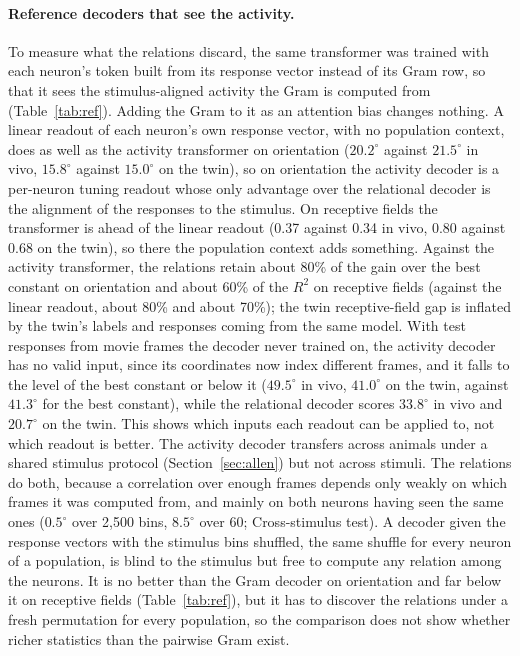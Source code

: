 \documentclass[11pt]{article}
\newcommand{\Rsq}{R^{2}}
\begin{document}
\paragraph{Reference decoders that see the activity.} To measure what the relations discard, the same transformer was trained with each neuron's token built from its response vector instead of its Gram row, so that it sees the stimulus-aligned activity the Gram is computed from (Table~\ref{tab:ref}). Adding the Gram to it as an attention bias changes nothing. A linear readout of each neuron's own response vector, with no population context, does as well as the activity transformer on orientation ($20.2^\circ$ against $21.5^\circ$ in vivo, $15.8^\circ$ against $15.0^\circ$ on the twin), so on orientation the activity decoder is a per-neuron tuning readout whose only advantage over the relational decoder is the alignment of the responses to the stimulus. On receptive fields the transformer is ahead of the linear readout (0.37 against 0.34 in vivo, 0.80 against 0.68 on the twin), so there the population context adds something. Against the activity transformer, the relations retain about 80\% of the gain over the best constant on orientation and about 60\% of the $\Rsq$ on receptive fields (against the linear readout, about 80\% and about 70\%); the twin receptive-field gap is inflated by the twin's labels and responses coming from the same model. With test responses from movie frames the decoder never trained on, the activity decoder has no valid input, since its coordinates now index different frames, and it falls to the level of the best constant or below it ($49.5^\circ$ in vivo, $41.0^\circ$ on the twin, against $41.3^\circ$ for the best constant), while the relational decoder scores $33.8^\circ$ in vivo and $20.7^\circ$ on the twin. This shows which inputs each readout can be applied to, not which readout is better. The activity decoder transfers across animals under a shared stimulus protocol (Section~\ref{sec:allen}) but not across stimuli. The relations do both, because a correlation over enough frames depends only weakly on which frames it was computed from, and mainly on both neurons having seen the same ones ($0.5^\circ$ over 2,500 bins, $8.5^\circ$ over 60; Cross-stimulus test). A decoder given the response vectors with the stimulus bins shuffled, the same shuffle for every neuron of a population, is blind to the stimulus but free to compute any relation among the neurons. It is no better than the Gram decoder on orientation and far below it on receptive fields (Table~\ref{tab:ref}), but it has to discover the relations under a fresh permutation for every population, so the comparison does not show whether richer statistics than the pairwise Gram exist.
\end{document}
